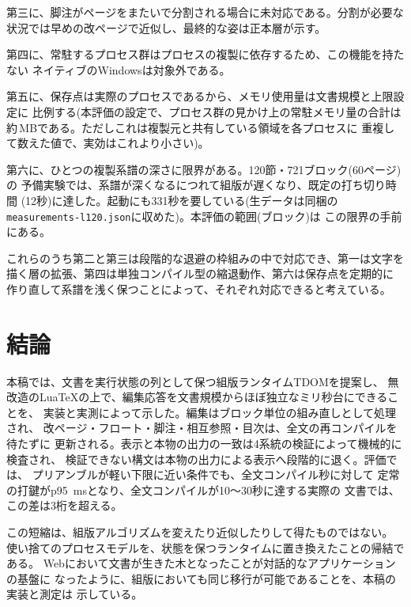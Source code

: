 \documentclass[a4paper,11pt]{ltjsarticle}
\newcommand{\tdom}{TDOM}
\newcommand{\code}[1]{\texttt{#1}}
\begin{document}
第三に、脚注がページをまたいで分割される場合に未対応である。分割が必要な
状況では早めの改ページで近似し、最終的な姿は正本層が示す。

第四に、常駐するプロセス群はプロセスの複製に依存するため、この機能を持たない
ネイティブのWindowsは対象外である。

第五に、保存点は実際のプロセスであるから、メモリ使用量は文書規模と上限設定に
比例する(本評価の設定で、プロセス群の見かけ上の常駐メモリ量の合計は
約\nMrss\,MBである。ただしこれは複製元と共有している領域を各プロセスに
重複して数えた値で、実効はこれより小さい)。

第六に、ひとつの複製系譜の深さに限界がある。120節・721ブロック(60ページ)の
予備実験では、系譜が深くなるにつれて組版が遅くなり、既定の打ち切り時間
(12秒)に達した。起動にも331秒を要している(生データは同梱の
\code{measurements-l120.json}に収めた)。本評価の範囲(\nLblocks ブロック)は
この限界の手前にある。

これらのうち第二と第三は段階的な退避の枠組みの中で対応でき、第一は文字を
描く層の拡張、第四は単独コンパイル型の縮退動作、第六は保存点を定期的に
作り直して系譜を浅く保つことによって、それぞれ対応できると考えている。

\section{結論}\label{sec:conclusion}

本稿では、文書を実行状態の列として保つ組版ランタイム\tdom{}を提案し、
無改造のLuaTeXの上で、編集応答を文書規模からほぼ独立なミリ秒台にできることを、
実装と実測によって示した。編集はブロック単位の組み直しとして処理され、
改ページ・フロート・脚注・相互参照・目次は、全文の再コンパイルを待たずに
更新される。表示と本物の出力の一致は4系統の検証によって機械的に検査され、
検証できない構文は本物の出力による表示へ段階的に退く。評価では、
プリアンブルが軽い下限に近い条件でも、全文コンパイル\nLcoldSec 秒に対して
定常の打鍵がp95 \nLtypPP\,msとなり、全文コンパイルが10〜30秒に達する実際の
文書\cite{lode2026}では、この差は3桁を超える。

この短縮は、組版アルゴリズムを変えたり近似したりして得たものではない。
使い捨てのプロセスモデルを、状態を保つランタイムに置き換えたことの帰結である。
Webにおいて文書が生きた木となったことが対話的なアプリケーションの基盤に
なったように、組版においても同じ移行が可能であることを、本稿の実装と測定は
示している。
\end{document}
